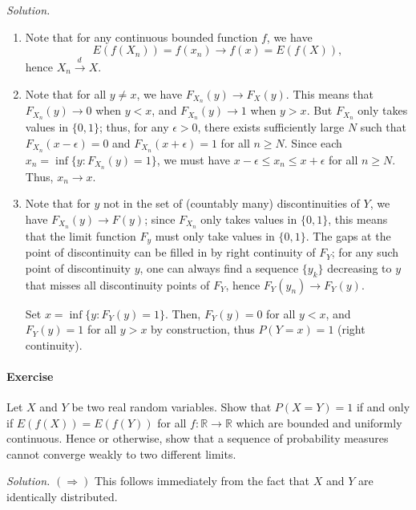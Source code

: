 \documentclass[10pt]{article}
\newcounter{prob}
\newcommand{\problem}{\stepcounter{prob}\paragraph{Exercise \arabic{prob}}}
\newcommand{\solution}{\textit{Solution.} }
\newcommand{\R}{\mathbb{R}}
\newcommand{\tod}{\overset{d\,}{\longrightarrow}}
\begin{document}
    \solution \begin{enumerate}
        \item Note that for any continuous bounded function $f$, we have \[
            E(f(X_n)) = f(x_n) \to f(x) = E(f(X)),
        \] hence $X_n \tod X$.

        \item Note that for all $y \neq x$, we have $F_{X_n}(y) \to F_X(y)$. This
        means that $F_{X_n}(y) \to 0$ when $y < x$, and $F_{X_n}(y) \to 1$ when $y >
        x$. But $F_{X_n}$ only takes values in $\{0, 1\}$; thus, for any $\epsilon >
        0$, there exists sufficiently large $N$ such that $F_{X_n}(x - \epsilon) = 0$
        and $F_{X_n}(x + \epsilon) = 1$ for all $n \geq N$. Since each $x_n = \inf
        \{y : F_{X_n}(y) = 1\}$, we must have $x - \epsilon \leq x_n \leq x +
        \epsilon$ for all $n \geq N$. Thus, $x_n \to x$.

        \item Note that for $y$ not in the set of (countably many) discontinuities of
        $Y$, we have $F_{X_n}(y) \to F(y)$; since $F_{X_n}$ only takes values in
        $\{0, 1\}$, this means that the limit function $F_y$ must only take values in
        $\{0, 1\}$. The gaps at the point of discontinuity can be filled in by right
        continuity of $F_Y$; for any such point of discontinuity $y$, one can always
        find a sequence $\{y_k\}$ decreasing to $y$ that misses all discontinuity
        points of $F_Y$, hence $F_Y(y_n) \to F_Y(y)$.

        Set $x = \inf\{y : F_Y(y) = 1\}$. Then, $F_Y(y) = 0$ for all $y < x$, and
        $F_Y(y) = 1$ for all $y > x$ by construction, thus $P(Y = x) = 1$ (right
        continuity).
    \end{enumerate}


    \problem Let $X$ and $Y$ be two real random variables. Show that $P(X = Y) = 1$
    if and only if $E(f(X)) = E(f(Y))$ for all $f\colon \R \to \R$ which are bounded
    and uniformly continuous. Hence or otherwise, show that a sequence of probability
    measures cannot converge weakly to two different limits.

    \solution $(\Rightarrow)$ This follows immediately from the fact that $X$ and $Y$
    are identically distributed.
\end{document}

